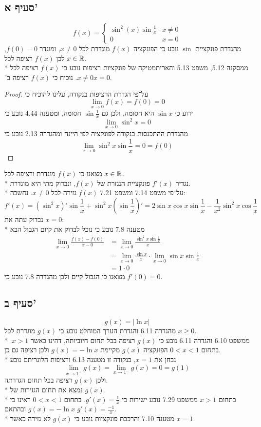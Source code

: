 \subsection{סעיף א'}
\[
	f(x) = \begin{cases}
		\sin^2(x) \sin \frac{1}{x} & x \ne 0 \\
		0 & x = 0
	\end{cases}
\]
מהגדרת פונקציית $\sin$ נובע כי הפונקציה $f(x)$ מוגדרת לכל $x \ne 0$, ומוגדר $f(0) = 0$, לכן $f(x)$ רציפה לכל $x \in \mathbb{R}$. \\*
ממסקנה 5.12, משפט 5.13 והאריתמטיקה של פונקציות רציפות נובע כי $f(x)$ רציפה לכל $x \ne 0$. נוכיח כי $f(x)$ רציפה ב־$x = 0$.
\begin{proof}
	על־פי הגדרת הרציפות בנקודה, עלינו להוכיח כי
	\[
		\lim_{x \to 0} f(x) = f(0) = 0
	\]
	ידוע כי $\sin x$ היא חסומה, ולכן גם $\sin \frac{1}{x}$ חסומה, ומטענה 4.44 נובע כי
	\[
		\lim_{x \to 0} \sin^2 x = 0
	\]
	מהגדרת ההתכנסות בנקודה לפונקציה לפי היינה ומהגדרה 2.13 נובע כי
	\[
		\lim_{x \to 0} \sin^2 x \sin \frac{1}{x} = 0 = f(0)
	\]
\end{proof}
מצאנו כי $f(x)$ מוגדרת ורציפה לכל $x \in \mathbb{R}$. \\*
נגדיר $f'(x)$ פונקציית הנגזרת של $f(x)$, ונבדוק מתי היא מוגדרת. \\*
על־פי משפט 7.14 ומשפט 7.21 $f(x)$ גזירה לכל $x \ne 0$. נחשבה:
\[
	f'(x) = (\sin^2 x)' \sin \frac{1}{x} + \sin^2 x (\sin \frac{1}{x})'
	= 2 \sin x \cos x \sin \frac{1}{x} - \frac{1}{x^2} \sin^2 x \cos \frac{1}{x}
\]
נבדוק עתה את $x = 0$: \\*
מטענה 7.8 נובע כי נוכל לבדוק את קיום הגבול הבא
\begin{align*}
	\lim_{x \to 0} \frac{f(x) - f(0)}{x - 0} & = \lim_{x \to 0} \frac{\sin^2 x \sin \frac{1}{x}}{x} \\
											 & = \lim_{x \to 0} \frac{\sin x}{x} \cdot \lim_{x \to 0} \sin x \sin \frac{1}{x} \\
											 & = 1 \cdot 0
\end{align*}
מצאנו כי הגבול קיים ולכן מהגדרה 7.8 נובע כי $f'(0) = 0$.

\subsection{סעיף ב'}
\[
	g(x) = |\ln x|
\]
מהגדרה 6.11 והגדרת הערך המוחלט נובע כי $g(x)$ מוגדרת לכל $x \ge 0$. \\*
ממשפט 6.10 והגדרה 6.11 נובע כי $g(x)$ רציפה בכל תחום חיוביותה, דהינו כאשר $x > 1$.
בתחום $0 < x < 1$ הפונקציה $g(x)$ מקיימת $g(x) = - \ln x$ ולכן רציפה גם כן. \\*
נבחן את $x = 1$, בנקודה זו מטענה 6.13 ורציפות הלוגריתם נובע
\[
	\lim_{x \to 1^+} g(x) = \lim_{x \to 1^-} g(x) = 0 = g(1)
\]
ולכן $g(x)$ רציפה בכל תחום הגדרתה. \\*
נמצא את תחום הגזירות של $g(x)$. \\*
בתחום $x > 1$ ממשפט 7.29 נובע ישירות כי $g'(x) = \frac{1}{x}$. בתחום $0 < x < 1$ ראינו כי $g(x) = - \ln x$ ובהתאם $g'(x) = \frac{-1}{x}$. \\*
מטענה 7.10 והרכבת פונקציות נובע כי $g(x)$ לא גזירה כאשר $x = 1$.

